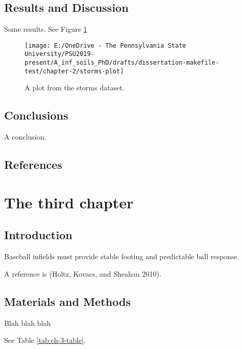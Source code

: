 \documentclass[
]{article}
\begin{document}
\hypertarget{results-and-discussion-1}{%
\subsection{Results and Discussion}\label{results-and-discussion-1}}

Some results. See Figure \ref{fig:storms-plot}

\begin{figure}
\texttt{[image: E:/OneDrive - The Pennsylvania State University/PSU2019-present/A\_inf\_soils\_PhD/drafts/dissertation-makefile-test/chapter-2/storms-plot]} \caption{A plot from the storms dataset.}\label{fig:storms-plot}
\end{figure}

\hypertarget{conclusions-1}{%
\subsection{Conclusions}\label{conclusions-1}}

A conclusion.

\hypertarget{references-1}{%
\subsection{References}\label{references-1}}

\clearpage

\hypertarget{the-third-chapter}{%
\section{The third chapter}\label{the-third-chapter}}

\hypertarget{introduction-2}{%
\subsection{Introduction}\label{introduction-2}}

Baseball infields must provide stable footing and predictable ball response.

A reference is (Holtz, Kovacs, and Sheahan 2010).

\hypertarget{materials-and-methods-2}{%
\subsection{Materials and Methods}\label{materials-and-methods-2}}

Blah blah blah

See Table \ref{tab:ch-3-table}.
\end{document}
